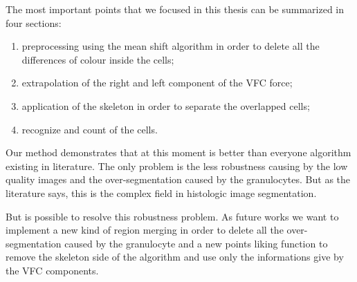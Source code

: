 The most important points that we focused in this thesis can be summarized in four sections:
\begin{enumerate}
\item preprocessing using the mean shift algorithm in order to delete all the differences of colour inside the cells;
\item extrapolation of the right and left component of the VFC force;
\item application of the skeleton in order to separate the overlapped cells;
\item recognize and count of the cells.
\end{enumerate}

\bigskip

Our method demonstrates that at this moment is better than everyone algorithm existing in literature. The only problem is the less robustness causing by the low quality images and the over-segmentation caused by the granulocytes. But as the literature says, this is the complex field in histologic image segmentation.

\bigskip

But is possible to resolve this robustness problem. As future works we want to implement a new kind of region merging in order to delete all the over-segmentation caused by the granulocyte and a new points liking function to remove the skeleton side of the algorithm and use only the informations give by the VFC components. 
